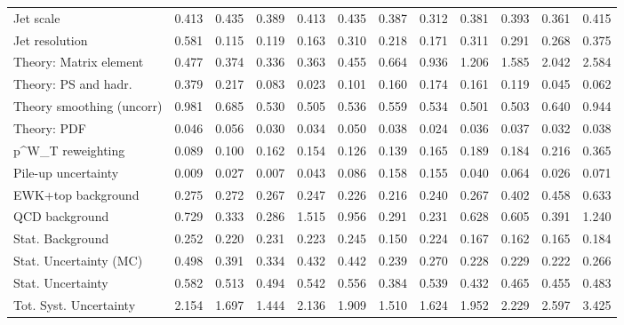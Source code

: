 \begin{tabular}{l|p{0.6cm}p{0.6cm}p{0.6cm}p{0.6cm}p{0.6cm}p{0.6cm}p{0.6cm}p{0.6cm}p{0.6cm}p{0.6cm}p{0.6cm}}
Jet scale                                & 0.413 & 0.435 & 0.389 & 0.413 & 0.435 & 0.387 & 0.312 & 0.381 & 0.393 & 0.361 & 0.415 \\
Jet resolution                           & 0.581 & 0.115 & 0.119 & 0.163 & 0.310 & 0.218 & 0.171 & 0.311 & 0.291 & 0.268 & 0.375 \\
Theory: Matrix element                   & 0.477 & 0.374 & 0.336 & 0.363 & 0.455 & 0.664 & 0.936 & 1.206 & 1.585 & 2.042 & 2.584 \\
Theory: PS and hadr.                     & 0.379 & 0.217 & 0.083 & 0.023 & 0.101 & 0.160 & 0.174 & 0.161 & 0.119 & 0.045 & 0.062 \\
Theory smoothing (uncorr)                & 0.981 & 0.685 & 0.530 & 0.505 & 0.536 & 0.559 & 0.534 & 0.501 & 0.503 & 0.640 & 0.944 \\
Theory: PDF                              & 0.046 & 0.056 & 0.030 & 0.034 & 0.050 & 0.038 & 0.024 & 0.036 & 0.037 & 0.032 & 0.038 \\
p^{W}_{T} reweighting                    & 0.089 & 0.100 & 0.162 & 0.154 & 0.126 & 0.139 & 0.165 & 0.189 & 0.184 & 0.216 & 0.365 \\
Pile-up uncertainty                      & 0.009 & 0.027 & 0.007 & 0.043 & 0.086 & 0.158 & 0.155 & 0.040 & 0.064 & 0.026 & 0.071 \\
EWK+top background                       & 0.275 & 0.272 & 0.267 & 0.247 & 0.226 & 0.216 & 0.240 & 0.267 & 0.402 & 0.458 & 0.633 \\
QCD background                           & 0.729 & 0.333 & 0.286 & 1.515 & 0.956 & 0.291 & 0.231 & 0.628 & 0.605 & 0.391 & 1.240 \\
Stat. Background                         & 0.252 & 0.220 & 0.231 & 0.223 & 0.245 & 0.150 & 0.224 & 0.167 & 0.162 & 0.165 & 0.184 \\
Stat. Uncertainty (MC)                   & 0.498 & 0.391 & 0.334 & 0.432 & 0.442 & 0.239 & 0.270 & 0.228 & 0.229 & 0.222 & 0.266 \\
\hline
Stat. Uncertainty                        & 0.582 & 0.513 & 0.494 & 0.542 & 0.556 & 0.384 & 0.539 & 0.432 & 0.465 & 0.455 & 0.483 \\
\hline
Tot. Syst. Uncertainty                   & 2.154 & 1.697 & 1.444 & 2.136 & 1.909 & 1.510 & 1.624 & 1.952 & 2.229 & 2.597 & 3.425 \\
\hline
\end{tabular}
